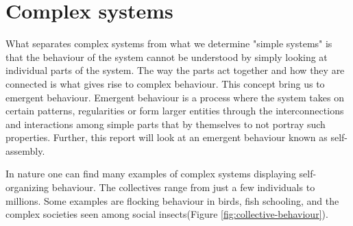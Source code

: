 \section{Complex systems}
\label{sec:complex_systems}
What separates complex systems from what we determine "simple systems" is that the behaviour of the system cannot be understood by simply looking at individual parts of the system.
The way the parts act together and how they are connected is what gives rise to complex behaviour.
This concept bring us to emergent behaviour.
Emergent behaviour is a process where the system takes on certain patterns, regularities or form larger entities through the interconnections and interactions among simple parts that by themselves to not portray such properties.
Further, this report will look at an emergent behaviour known as self-assembly.  

In nature one can find many examples of complex systems displaying self-organizing behaviour.
The collectives range from just a few individuals to millions.
Some examples are flocking behaviour in birds, fish schooling, and the complex societies seen among social insects(Figure \ref{fig:collective-behaviour}). 

